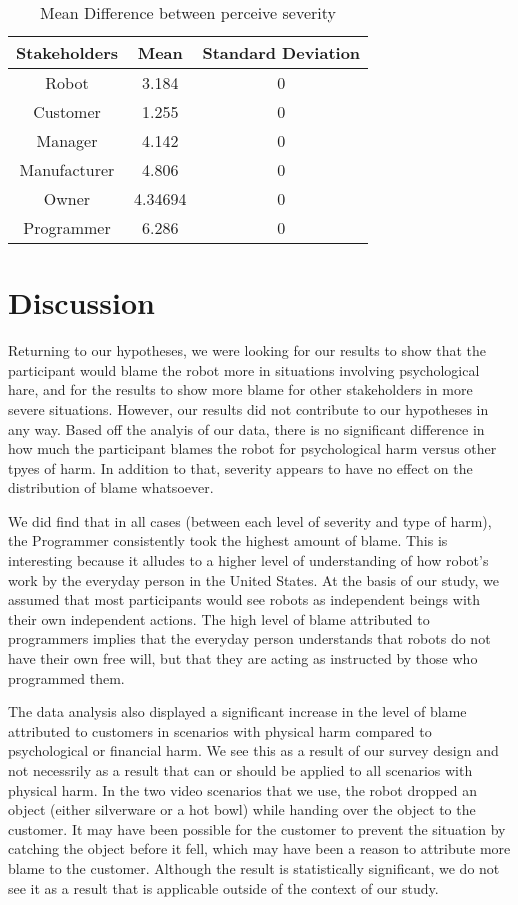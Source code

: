 \documentclass{sigchi}
\begin{document}
\begin{table}[h]
  \centering
  \begin{tabular}{|c|c|c|}
    \hline
    Stakeholders & Mean & Standard Deviation\\
    \hline
    Robot & 3.184 & 0\\
    \hline
    Customer & 1.255 & 0\\
    \hline
    Manager & 4.142 & 0 \\
    \hline
    Manufacturer & 4.806 & 0 \\
    \hline
    Owner & 4.34694 & 0 \\
    \hline
    Programmer & 6.286 & 0 \\
    \hline
  \end{tabular}
  \caption{Mean Difference between perceive severity}
  \label{tab:table2}
\end{table}

\section{Discussion}
Returning to our hypotheses, we were looking for our results to show that the participant would blame the robot more in situations involving psychological hare, and for the results to show more blame for other stakeholders in more severe situations. However, our results did not contribute to our hypotheses in any way. Based off the analyis of our data, there is no significant difference in how much the participant blames the robot for psychological harm versus other tpyes of harm. In addition to that, severity appears to have no effect on the distribution of blame whatsoever.

We did find that in all cases (between each level of severity and type of harm), the Programmer consistently took the highest amount of blame. This is interesting because it alludes to a higher level of understanding of how robot's work by the everyday person in the United States. At the basis of our study, we assumed that most participants would see robots as independent beings with their own independent actions. The high level of blame attributed to programmers implies that the everyday person understands that robots do not have their own free will, but that they are acting as instructed by those who programmed them. 

The data analysis also displayed a significant increase in the level of blame attributed to customers in scenarios with physical harm compared to psychological or financial harm. We see this as a result of our survey design and not necessrily as a result that can or should be applied to all scenarios with physical harm. In the two video scenarios that we use, the robot dropped an object (either silverware or a hot bowl) while handing over the object to the customer. It may have been possible for the customer to prevent the situation by catching the object before it fell, which may have been a reason to attribute more blame to the customer. Although the result is statistically significant, we do not see it as a result that is applicable outside of the context of our study.
\end{document}
